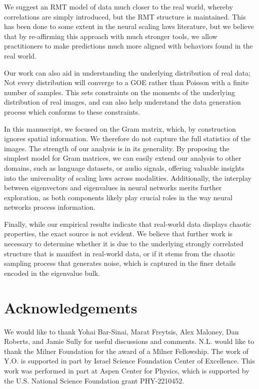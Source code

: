 \documentclass{article}
\begin{document}
We suggest an RMT model of data much closer to the real world, whereby correlations are simply introduced, but the RMT structure is maintained. This has been done to some extent in the neural scaling laws literature, but we believe that by re-affirming this approach with much stronger tools, we allow practitioners to make predictions much more aligned with behaviors found in the real world. 

Our work can also aid in understanding the underlying distribution of real data; Not every distribution will converge to a GOE rather than Poisson with a finite number of samples. This sets constraints on the moments of the underlying distribution of real images, and can also help understand the data generation process which conforms to these constraints.

In this manuscript, we focused on the Gram matrix, which, by construction ignores spatial information. We therefore do not capture the full statistics of the images.
The strength of our analysis is in its generality. By proposing the simplest model for Gram matrices, we can easily extend our analysis to other domains, such as language datasets, or audio signals, offering valuable insights into the universality of scaling laws across modalities. Additionally, the interplay between eigenvectors and eigenvalues in neural networks merits further exploration, as both components likely play crucial roles in the way neural networks process information. 

Finally, while our empirical results indicate that real-world data displays chaotic properties, the exact source is not evident. We believe that further work is necessary to determine whether it is due to the underlying strongly correlated structure that is manifest in real-world data, or if it stems from the chaotic sampling process that generates noise, which is captured in the finer details encoded in the eigenvalue bulk.


\section{Acknowledgements}
\label{sec:Acknowledgements}

We would like to thank Yohai Bar-Sinai, Marat Freytsis, Alex Maloney, Dan Roberts, and Jamie Sully for useful discussions and comments. N.L. would
like to thank the Milner Foundation for the award of a Milner Fellowship.
The work of Y.O. is supported in part by Israel Science Foundation Center of Excellence.
This work was performed in part at Aspen Center for Physics, which is supported by the U.S. National Science Foundation grant PHY-2210452.
\end{document}
